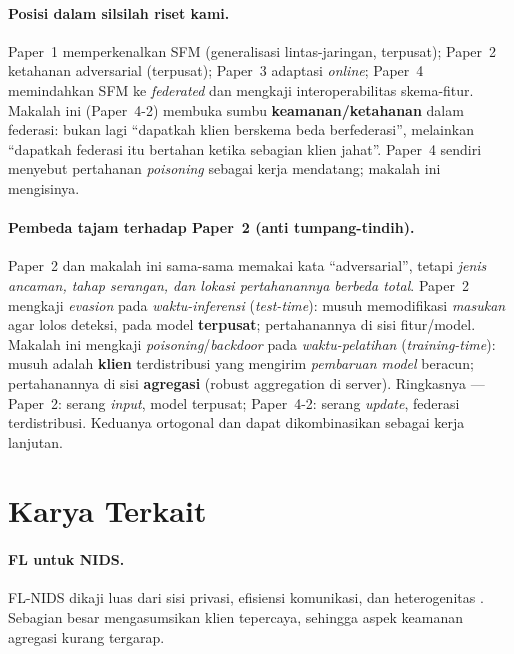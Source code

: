 \documentclass[11pt,a4paper]{article}
\begin{document}
\paragraph{Posisi dalam silsilah riset kami.} Paper~1 memperkenalkan SFM
(generalisasi lintas-jaringan, terpusat); Paper~2 ketahanan adversarial (terpusat);
Paper~3 adaptasi \emph{online}; Paper~4 memindahkan SFM ke \emph{federated} dan
mengkaji interoperabilitas skema-fitur. Makalah ini (Paper~4-2) membuka sumbu
\textbf{keamanan/ketahanan} dalam federasi: bukan lagi ``dapatkah klien berskema
beda berfederasi'', melainkan ``dapatkah federasi itu bertahan ketika sebagian
klien jahat''. Paper~4 sendiri menyebut pertahanan \emph{poisoning} sebagai kerja
mendatang; makalah ini mengisinya.

\paragraph{Pembeda tajam terhadap Paper~2 (anti tumpang-tindih).} Paper~2 dan
makalah ini sama-sama memakai kata ``adversarial'', tetapi \emph{jenis ancaman,
tahap serangan, dan lokasi pertahanannya berbeda total}. Paper~2 mengkaji
\emph{evasion} pada \emph{waktu-inferensi} (\emph{test-time}): musuh memodifikasi
\emph{masukan} agar lolos deteksi, pada model \textbf{terpusat}; pertahanannya di
sisi fitur/model. Makalah ini mengkaji \emph{poisoning}/\emph{backdoor} pada
\emph{waktu-pelatihan} (\emph{training-time}): musuh adalah \textbf{klien}
terdistribusi yang mengirim \emph{pembaruan model} beracun; pertahanannya di sisi
\textbf{agregasi} (robust aggregation di server). Ringkasnya --- Paper~2: serang
\emph{input}, model terpusat; Paper~4-2: serang \emph{update}, federasi
terdistribusi. Keduanya ortogonal dan dapat dikombinasikan sebagai kerja lanjutan.

\FloatBarrier
\section{Karya Terkait}
\label{sec:related}

\paragraph{FL untuk NIDS.} FL-NIDS dikaji luas dari sisi privasi, efisiensi
komunikasi, dan heterogenitas \cite{fsurvey1,fsurvey2,ftaxonomy}. Sebagian besar
mengasumsikan klien tepercaya, sehingga aspek keamanan agregasi kurang tergarap.
\end{document}
